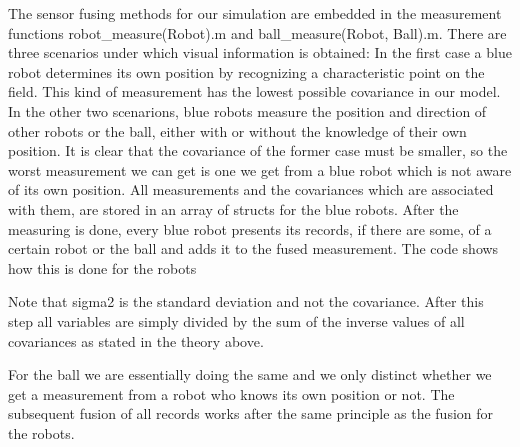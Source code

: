 The sensor fusing methods for our simulation are embedded in the measurement functions {\selectfont robot\_measure(Robot).m} and {\selectfont ball\_measure(Robot, Ball).m}. There are three scenarios under which visual information is obtained: In the first case a blue robot determines its own position by recognizing a characteristic point on the field. This kind of measurement has the lowest possible covariance in our model. In the other two scenarions, blue robots measure the position and direction of other robots or the ball, either with or without the knowledge of their own position. It is clear that the covariance of the former case must be smaller, so the worst measurement we can get is one we get from a blue robot which is not aware of its own position. All measurements and the covariances which are associated with them, are stored in an array of structs for the blue robots. After the measuring is done, every blue robot presents its records, if there are some, of a certain robot or the ball and adds it to the fused measurement. The code shows how this is done for the robots


\parskip 20pt

Note that {\selectfont sigma2} is the standard deviation and not the covariance. After this step all variables are simply divided by the sum of the inverse values of all covariances as stated in the theory above. 



For the ball we are essentially doing the same and we only distinct whether we get a measurement from a robot who knows its own position or not. The subsequent fusion of all records works after the same principle as the fusion for the robots.




